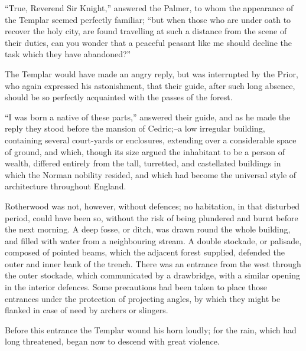 ``True, Reverend Sir Knight,'' answered the Palmer, to whom the
appearance of the Templar seemed perfectly familiar; ``but when those
who are under oath to recover the holy city, are found travelling at
such a distance from the scene of their duties, can you wonder that a
peaceful peasant like me should decline the task which they have
abandoned?''

The Templar would have made an angry reply, but was interrupted by the
Prior, who again expressed his astonishment, that their guide, after
such long absence, should be so perfectly acquainted with the passes of
the forest.

``I was born a native of these parts,'' answered their guide, and as he
made the reply they stood before the mansion of Cedric;--a low irregular
building, containing several court-yards or enclosures, extending over a
considerable space of ground, and which, though its size argued the
inhabitant to be a person of wealth, differed entirely from the tall,
turretted, and castellated buildings in which the Norman nobility
resided, and which had become the universal style of architecture
throughout England.

Rotherwood was not, however, without defences; no habitation, in that
disturbed period, could have been so, without the risk of being
plundered and burnt before the next morning. A deep fosse, or ditch, was
drawn round the whole building, and filled with water from a
neighbouring stream. A double stockade, or palisade, composed of pointed
beams, which the adjacent forest supplied, defended the outer and inner
bank of the trench. There was an entrance from the west through the
outer stockade, which communicated by a drawbridge, with a similar
opening in the interior defences. Some precautions had been taken to
place those entrances under the protection of projecting angles, by
which they might be flanked in case of need by archers or slingers.

Before this entrance the Templar wound his horn loudly; for the rain,
which had long threatened, began now to descend with great violence.
